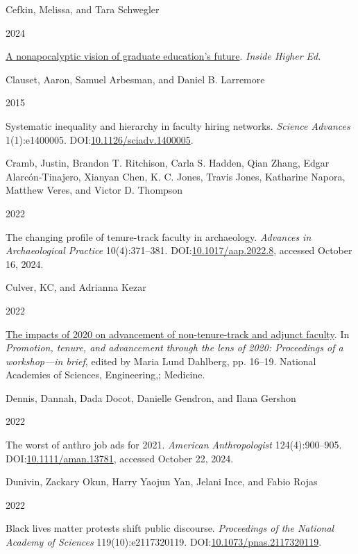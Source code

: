 \documentclass[
  12pt,
]{article}
\newlength{\cslhangindent}
\newlength{\csllabelwidth}
\newenvironment{CSLReferences}[2] %
 {\begin{list}{}{%
  \setlength{\itemindent}{0pt}
  \setlength{\leftmargin}{0pt}
  \setlength{\parsep}{0pt}
  \ifodd #1
   \setlength{\leftmargin}{\cslhangindent}
   \setlength{\itemindent}{-1\cslhangindent}
  \fi
  \setlength{\itemsep}{#2\baselineskip}}}
 {\end{list}}
\newcommand{\CSLBlock}[1]{\hfill\break\parbox[t]{\linewidth}{\strut\ignorespaces#1\strut}}
\newcommand{\CSLLeftMargin}[1]{\parbox[t]{\csllabelwidth}{\strut#1\strut}}
\newcommand{\CSLRightInline}[1]{\parbox[t]{\linewidth - \csllabelwidth}{\strut#1\strut}}
\begin{document}
\begin{CSLReferences}{0}{1}
\CSLBlock{Cefkin, Melissa, and Tara Schwegler}
\CSLLeftMargin{ 2024}%
\CSLRightInline{\href{https://www.insidehighered.com/opinion/career-advice/2024/05/09/graduate-work-must-focus-both-academic-and-applied-opinion}{A
nonapocalyptic vision of graduate education{'}s future}. \emph{Inside
Higher Ed}.}

\CSLBlock{Clauset, Aaron, Samuel Arbesman, and Daniel B. Larremore}
\CSLLeftMargin{ 2015}%
\CSLRightInline{Systematic inequality and hierarchy in faculty hiring
networks. \emph{Science Advances} 1(1):e1400005.
DOI:\href{https://doi.org/10.1126/sciadv.1400005}{10.1126/sciadv.1400005}.}

\CSLBlock{Cramb, Justin, Brandon T. Ritchison, Carla S. Hadden, Qian
Zhang, Edgar Alarcón-Tinajero, Xianyan Chen, K. C. Jones, Travis Jones,
Katharine Napora, Matthew Veres, and Victor D. Thompson}
\CSLLeftMargin{ 2022}%
\CSLRightInline{The changing profile of tenure-track faculty in
archaeology. \emph{Advances in Archaeological Practice} 10(4):371--381.
DOI:\href{https://doi.org/10.1017/aap.2022.8}{10.1017/aap.2022.8},
accessed October 16, 2024.}

\CSLBlock{Culver, KC, and Adrianna Kezar}
\CSLLeftMargin{ 2022}%
\CSLRightInline{\href{https://doi.org/10.17226/26405}{The impacts of
2020 on advancement of non-tenure-track and adjunct faculty}. In
\emph{Promotion, tenure, and advancement through the lens of 2020:
Proceedings of a workshop---in brief}, edited by Maria Lund Dahlberg,
pp. 16--19. National Academies of Sciences, Engineering,; Medicine.}

\CSLBlock{Dennis, Dannah, Dada Docot, Danielle Gendron, and Ilana
Gershon}
\CSLLeftMargin{ 2022}%
\CSLRightInline{The worst of anthro job ads for 2021. \emph{American
Anthropologist} 124(4):900--905.
DOI:\href{https://doi.org/10.1111/aman.13781}{10.1111/aman.13781},
accessed October 22, 2024.}

\CSLBlock{Dunivin, Zackary Okun, Harry Yaojun Yan, Jelani Ince, and
Fabio Rojas}
\CSLLeftMargin{ 2022}%
\CSLRightInline{Black lives matter protests shift public discourse.
\emph{Proceedings of the National Academy of Sciences}
119(10):e2117320119.
DOI:\href{https://doi.org/10.1073/pnas.2117320119}{10.1073/pnas.2117320119}.}


\end{CSLReferences}
\end{document}
